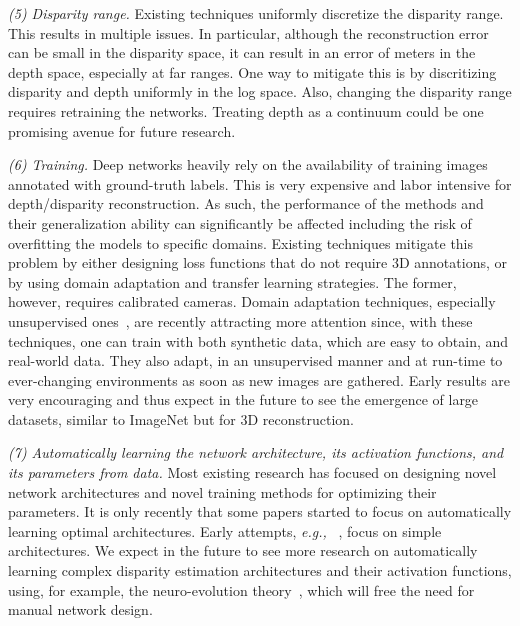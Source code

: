 \documentclass[10pt,journal,compsoc]{IEEEtran}
\newcommand{\eg}{\emph{e.g., }}
\newcommand{\noi}{\noindent}
\begin{document}
\vspace{6pt}
\noi\textit{(5) Disparity range. } Existing  techniques uniformly discretize the disparity range. This results in multiple issues.  In particular, although the reconstruction error can be small in the disparity space, it can result in an error of meters in the depth space, especially at far ranges. One way to mitigate this is by discritizing disparity and depth uniformly in the log space.   Also, changing the disparity range requires retraining the networks.  Treating depth as a continuum could be one promising avenue for future research. 
	
	






	






\vspace{6pt}
\noi\textit{(6) Training. } Deep networks heavily rely  on the availability of training images annotated with ground-truth labels. This is very expensive and labor intensive for  depth/disparity reconstruction. As such, the performance of the methods and their generalization ability can significantly be affected including the risk of overfitting the models to specific domains.  Existing techniques mitigate this problem by either designing loss functions that do not require 3D annotations, or by using domain adaptation and transfer learning strategies. The former, however, requires calibrated cameras.  Domain adaptation techniques, especially unsupervised ones~\cite{tonioni2019unsupervised}, are recently attracting more attention since, with these techniques, one can train with both synthetic data, which are easy to obtain, and real-world data. They also adapt, in an unsupervised manner and at run-time to ever-changing environments as soon as new images are gathered. Early results are very encouraging and thus expect in the future to see the emergence of large datasets, similar to ImageNet but for 3D reconstruction.








\vspace{6pt}
\noi\textit{(7) Automatically learning the network architecture, its activation functions,  and its parameters from data. }  Most existing research has focused on designing novel network architectures and novel training methods for optimizing their parameters. It is only recently that some papers started to focus on automatically learning optimal architectures. Early attempts, \eg~\cite{Saikia_2019_ICCV}, focus on simple architectures. We  expect in the future to see more research on automatically learning complex disparity estimation architectures and their activation functions, using, for example, the neuro-evolution theory~\cite{stanley2019designing,bingham2020evolutionary}, which will free the need for manual network design.  
	
\end{document}
